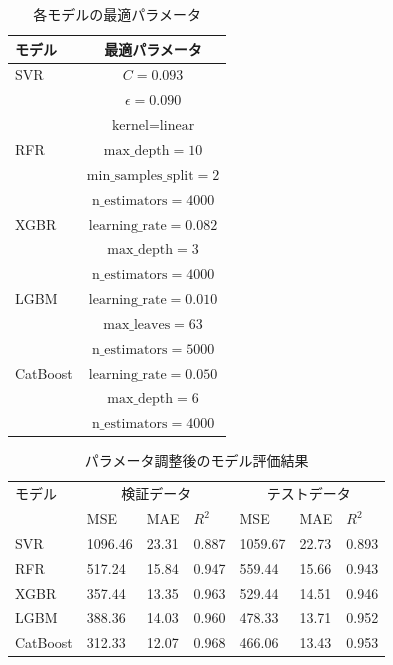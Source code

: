 \begin{table}[htbp]
    \centering
    \doublerulesep=0.3pt
    \caption{各モデルの最適パラメータ}
    \label{tab:best_params}
    \begin{tabular}{l|c}
        \hline\hline\hline
        モデル & 最適パラメータ \\
        \hline
        SVR & $C=0.093$ \\ 
            & $\epsilon=0.090$\\
            & $\text{kernel}=\text{linear}$ \\
        \hline
        RFR & $\text{max\_depth}=10$ \\
                     & $\text{min\_samples\_split}=2$ \\
                     & $\text{n\_estimators}=4000$ \\
        \hline
        XGBR & $\text{learning\_rate}=0.082$ \\
                & $\text{max\_depth}=3$ \\
                & $\text{n\_estimators}=4000$ \\
        \hline
        LGBM & $\text{learning\_rate}=0.010$ \\ 
             & $\text{max\_leaves}=63$ \\
             & $\text{n\_estimators}=5000$ \\
        \hline
        CatBoost & $\text{learning\_rate}=0.050$ \\
                 & $\text{max\_depth}=6$ \\
                 & $\text{n\_estimators}=4000$ \\
        \hline\hline\hline
    \end{tabular}
\end{table}

\begin{table}[htbp]
    \centering
    \doublerulesep=0.3pt
    \caption{パラメータ調整後のモデル評価結果}
    \label{tab:tuned_results}
    \begin{tabular}{l|p{0.8cm}p{0.8cm}p{0.8cm}|p{0.8cm}p{0.8cm}p{0.8cm}}
        \hline\hline\hline
        モデル & \multicolumn{3}{c|}{検証データ} & \multicolumn{3}{c}{テストデータ} \\
               & MSE & MAE & $R^2$ & MSE & MAE & $R^2$ \\
        \hline
        SVR       & 1096.46 & 23.31 & 0.887 & 1059.67 & 22.73 & 0.893 \\
        RFR       & 517.24  & 15.84 & 0.947 & 559.44  & 15.66 & 0.943 \\
        XGBR      & 357.44  & 13.35 & 0.963 & 529.44  & 14.51 & 0.946 \\
        LGBM      & 388.36  & 14.03 & 0.960 & 478.33  & 13.71 & 0.952 \\
        CatBoost  & 312.33  & 12.07 & 0.968 & 466.06  & 13.43 & 0.953 \\
        \hline\hline\hline
    \end{tabular}
\end{table}

